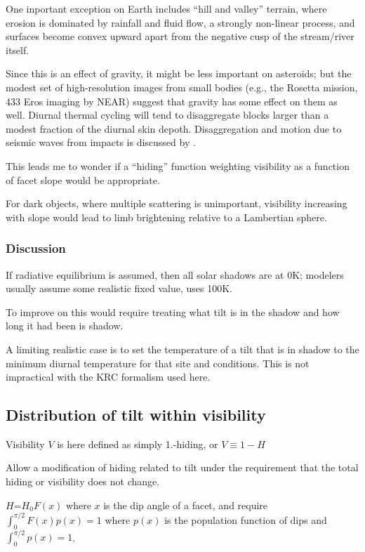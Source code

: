 \documentclass{article}
\begin{document}
One inportant exception on Earth includes ``hill and valley'' terrain, where
erosion is dominated by rainfall and fluid flow, a strongly non-linear process,
and surfaces become convex upward apart from the negative cusp of the
stream/river itself.

Since this is an effect of gravity, it might be less important on asteroids; but
the modest set of high-resolution images from small bodies (e.g., the Rosetta
mission, 433 Eros imaging by NEAR) suggest that gravity has some effect on them
as well. Diurnal thermal cycling will tend to disaggregate blocks larger than a
modest fraction of the diurnal skin depoth. Disaggregation and motion due to
seismic waves from impacts is discussed by .

This leads me to wonder if a ``hiding'' function weighting visibility as a
function of facet slope would be appropriate.  

For dark objects, where multiple scattering is unimportant, visibility
increasing with slope would lead to limb brightening relative to a Lambertian
sphere.
 
\subsubsection{Discussion}

If radiative equilibrium is assumed, then all solar shadows are at 0K; modelers
usually assume some realistic fixed value,  uses 100K.
 
 To improve on this would require treating what tilt is in the shadow and how
 long it had been is shadow.

 A limiting realistic case is to set the temperature of a tilt that is in shadow
 to the minimum diurnal temperature for that site and conditions. This is not
 impractical with the KRC formalism used here.
 
\subsection{Distribution of tilt within visibility} %
Visibility $V$ is here defined as simply 1.-hiding, or $V\equiv 1-H$

Allow a modification of hiding related to tilt under the requirement that the
total hiding or visibility does not change.

$H$=$H_0 F(x)$ where $x$ is the dip angle of a facet, and require
$\int_0^{\pi/2} F(x)p(x) =1$ where $p(x)$ is the population function of dips and
$\int_0^{\pi/2} p(x) =1$.
\end{document}
